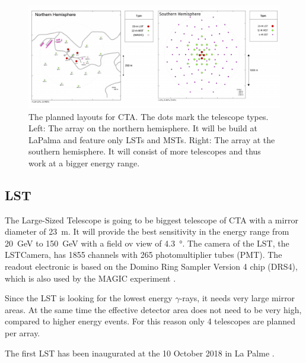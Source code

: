 \begin{figure}
	\center
	\includegraphics[width=\textwidth]{images/cta_layout.png}
	\caption{The planned layouts for CTA. The dots mark the telescope types.
	Left: The array on the northern hemisphere. It will be build at LaPalma
	and feature only LSTs and MSTs.
	Right: The array at the southern hemisphere.
	It will consist of more telescopes and thus 
	work at a bigger energy range.
	\cite{cta_web}}
	\label{fig:cta_layout}
\end{figure}


\subsection{LST}
\label{sec:lst}

The Large-Sized Telescope is going to be biggest telescope of CTA
with a mirror diameter of \SI{23}{\meter}.
It will provide the best sensitivity in the energy range from 
\SI{20}{\giga\electronvolt} to \SI{150}{\giga\electronvolt} with a field ov view of \SI{4.3}{\degree}.
The camera of the LST, the LSTCamera, has \num{1855} channels 
with \num{265} photomultiplier tubes (PMT).
The readout electronic is based on the Domino Ring Sampler 
Version 4 chip (DRS4), which is also used by the MAGIC experiment
\cite{drs4 paper} \cite{drs4 at magic paper}. 

Since the LST is looking for the lowest energy $\gamma$-rays, it needs
very large mirror areas. At the same time the effective detector area does 
not need to be very high, compared to higher energy events.
For this reason only 4 telescopes are planned per array.

The first LST has been inaugurated at the 10 October 2018 in La Palme \cite{lst_debut}.

